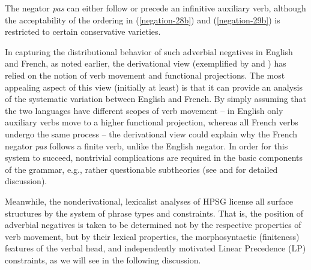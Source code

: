 \documentclass[output=paper
                ,modfonts
                ,nonflat
	        ,collection
	        ,collectionchapter
	        ,collectiontoclongg
 	        ,biblatex
                ,babelshorthands
                ,newtxmath
                ,draftmode
                ,colorlinks, citecolor=brown
]{./langsci/langscibook}
\begin{document}
{\begin{exe}
\begin{xlist}
\begin{exe}
\begin{xlist}
\noindent
The negator \textit{pas} can either follow or precede an infinitive
auxiliary verb, although the acceptability of the
ordering in (\ref{negation-28b}) and (\ref{negation-29b}) is restricted to certain conservative
varieties.

In capturing the distributional behavior of such adverbial negatives
in English and French, as noted earlier, the derivational view (exemplified by \citealt{Pollock:89} and \citealt{Chomsky:91})
has relied on the notion of verb
movement and functional projections.  The most appealing aspect of this
view (initially at least) is that it can provide an analysis of the
systematic variation
between English and French. By simply assuming that the
two languages have different scopes of verb movement -- in English
only auxiliary verbs move to a higher functional projection, whereas
all French verbs undergo the same process -- the derivational
view could explain why the French negator \textit{pas} follows
a finite verb, unlike the English negator.  In order for this system to succeed,
nontrivial complications are required in the basic components of the
grammar, e.g., rather questionable subtheories (see \citealt[Chapter~3]{Kim:00} and \citealt{KS:02}
for detailed discussion).

Meanwhile, the nonderivational, lexicalist analyses of HPSG
license all surface structures by the system of phrase types
and constraints.  That is, the position of
adverbial negatives is taken to be determined not by
the respective properties of verb movement, but by their lexical
properties, the morphosyntactic (finiteness) features of the verbal head,
and independently motivated Linear Precedence (LP) constraints, as
we will see in the following discussion.

\end{xlist}
\end{exe}
\end{xlist}
\end{exe}}
\end{document}
